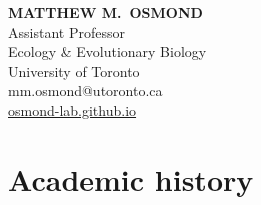 \documentclass[12pt]{article}
\begin{document}
\thispagestyle{empty}
\pagestyle{fancy}

{\raggedleft
\noindent\Large{\textbf{MATTHEW M.\ OSMOND}}\\
\large Assistant Professor\\
\large Ecology \& Evolutionary Biology\\
\large University of Toronto \\
\large mm.osmond@utoronto.ca\\
\href{https:/osmond-lab.github.io}{osmond-lab.github.io}\\
}

\section*{Academic history}
\end{document}

